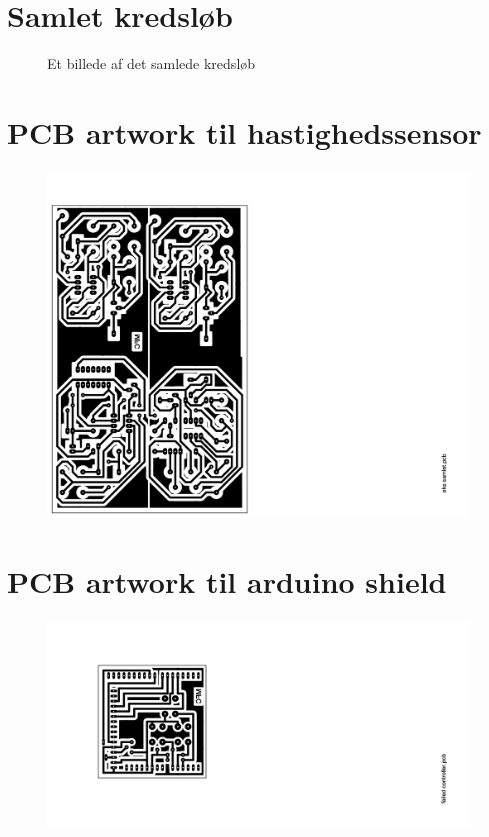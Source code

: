 \section{Samlet kredsløb} \label{bilag:samletkreds}
\begin{figure}[H]
  \centering
  \caption{Et billede af det samlede kredsløb}
  \label{}
\end{figure}
\newpage


\section{PCB artwork til hastighedssensor}\label{bilag:afsenderModtagerArtwork}
\begin{figure}[H]
	\centering
    \includegraphics[width=210mm]{figures/2_5fremstilling/afsenderModtagerArtwork.png}
\end{figure}


\section{PCB artwork til arduino shield} \label{bilag:shieldArtwork}
\begin{figure}[H]
	\centering
    \includegraphics[width=210mm]{figures/2_5fremstilling/shieldArtwork.png}
\end{figure}

